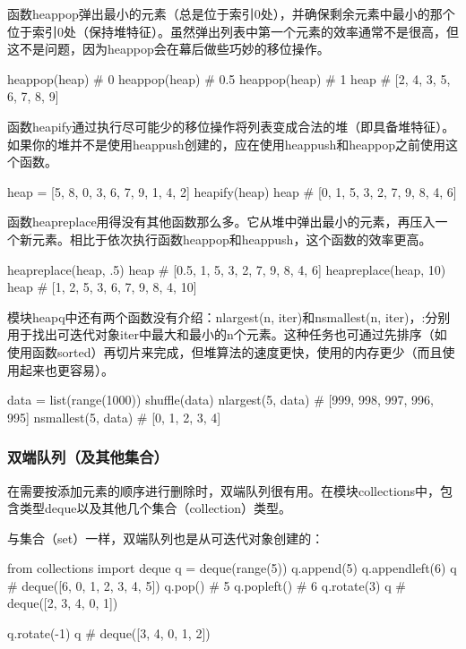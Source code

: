 函数heappop弹出最小的元素（总是位于索引0处），并确保剩余元素中最小的那个位于索引0处（保持堆特征）。虽然弹出列表中第一个元素的效率通常不是很高，但这不是问题，因为heappop会在幕后做些巧妙的移位操作。

\begin{pyc}
heappop(heap)  # 0
heappop(heap)  # 0.5
heappop(heap)  # 1
heap  # [2, 4, 3, 5, 6, 7, 8, 9]
\end{pyc}

函数heapify通过执行尽可能少的移位操作将列表变成合法的堆（即具备堆特征）。如果你的堆并不是使用heappush创建的，应在使用heappush和heappop之前使用这个函数。
\begin{pyc}
heap = [5, 8, 0, 3, 6, 7, 9, 1, 4, 2]
heapify(heap)
heap  # [0, 1, 5, 3, 2, 7, 9, 8, 4, 6]
\end{pyc}

函数heapreplace用得没有其他函数那么多。它从堆中弹出最小的元素，再压入一个新元素。相比于依次执行函数heappop和heappush，这个函数的效率更高。

\begin{pyc}
heapreplace(heap, .5)
heap  # [0.5, 1, 5, 3, 2, 7, 9, 8, 4, 6]
heapreplace(heap, 10)
heap  # [1, 2, 5, 3, 6, 7, 9, 8, 4, 10]
\end{pyc}

模块heapq中还有两个函数没有介绍：nlargest(n, iter)和nsmallest(n, iter)，:分别用于找出可迭代对象iter中最大和最小的n个元素。这种任务也可通过先排序（如使用函数sorted）再切片来完成，但堆算法的速度更快，使用的内存更少（而且使用起来也更容易）。

\begin{pyc}
data = list(range(1000))
shuffle(data)
nlargest(5, data)  # [999, 998, 997, 996, 995]
nsmallest(5, data)  # [0, 1, 2, 3, 4]
\end{pyc}
\subsubsection{双端队列（及其他集合）}
在需要按添加元素的顺序进行删除时，双端队列很有用。在模块collections中，包含类型deque以及其他几个集合（collection）类型。

与集合（set）一样，双端队列也是从可迭代对象创建的：

\begin{pyc}
from collections import deque
q = deque(range(5))
q.append(5)
q.appendleft(6)
q  # deque([6, 0, 1, 2, 3, 4, 5])
q.pop()  # 5
q.popleft()  # 6
q.rotate(3)
q  # deque([2, 3, 4, 0, 1])

q.rotate(-1)
q  # deque([3, 4, 0, 1, 2])
\end{pyc}

